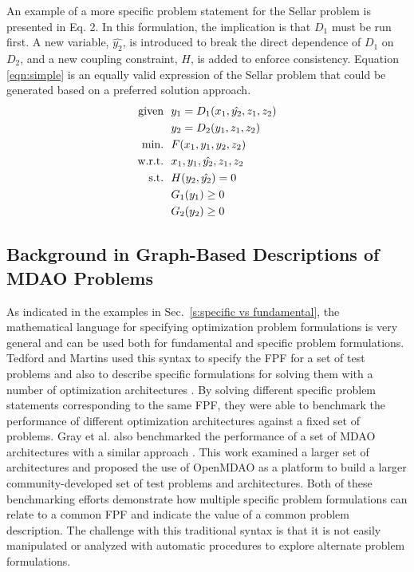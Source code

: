 An example of a more specific problem statement for the Sellar problem is presented in Eq. 2.
In this formulation, the implication is that  $D_1$ must be run
    first. A new variable, $\hat{y_2}$, is introduced to break the direct dependence of
    $D_1$ on $D_2$, and a new coupling constraint, $H$, is added to enforce
    consistency. Equation \ref{eqn:simple} is
    an equally valid expression of the Sellar problem that could be
    generated  based on a preferred solution approach.
    \begin{align}
        \textrm{given} & \ \ y_1 = D_1(x_1,\hat{y_2},z_1,z_2) \notag
        \\      & \ \ y_2 = D_2(y_1,z_1,z_2) \notag
        \\\textrm{min.} &\ \ F(x_1,y_1,y_2,z_2) \notag
        \\\textrm{w.r.t.} & \ \ x_1,y_1,\hat{y_2},z_1,z_2 \notag
        \\\textrm{s.t.} & \ \ H(y_2,\hat{y_2}) = 0 \notag
        \\     & \ \ G_1(y_1) \geq 0 \notag
        \\     & \ \ G_2(y_2) \geq 0
        \label{eqn:simple}
    \end{align}
\subsection{Background in Graph-Based Descriptions of MDAO Problems}
	\label{s:existing syntax}
    As indicated in the examples in Sec.~\ref{s:specific vs fundamental}, the mathematical
    language for specifying optimization problem formulations is very general and can be used both for
    fundamental and specific problem formulations. Tedford and Martins used this syntax to specify the
    FPF for a set of test problems and also to describe specific formulations for solving them with a
    number of optimization architectures \cite{Tedford2009}. By solving different specific problem statements corresponding to the same FPF, they were able to  benchmark the performance of different optimization architectures against a fixed set of
    problems. Gray et al. also benchmarked the performance of a set of MDAO architectures  with a similar approach \cite{Gray2013}.
    This work examined a larger set of architectures and proposed the use of OpenMDAO as a platform to build a larger community-developed set of test problems and architectures. Both of these benchmarking efforts
    demonstrate how multiple specific problem formulations can relate to a common FPF and indicate the
    value of a common problem description. The challenge with this
    traditional syntax is that it is not easily manipulated or analyzed with automatic procedures to explore alternate problem formulations.

